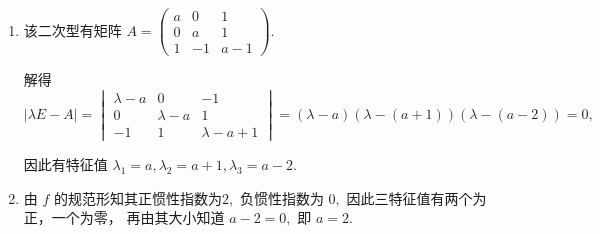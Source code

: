 \begin{answer}[2009T23]{}
    \begin{enumerate}[label=(\Roman*),topsep = 0pt]
        \item 该二次型有矩阵 $ A = \begin{pmatrix}
            a&0&1\\0&a&1\\ 1&-1&a-1
        \end{pmatrix}. $ 
        
        解得 $ |\lambda E-A| = \begin{vmatrix}
            \lambda-a&0&-1\\0&\lambda-a&1\\-1&1&\lambda-a+1
        \end{vmatrix} = (\lambda-a)(\lambda-(a+1))(\lambda - (a-2)) = 0, $ 
        
        因此有特征值 $ \lambda_1 = a,\lambda_2 = a+1,\lambda_3 = a-2. $ 
        \item 由 $ f $ 的规范形知其正惯性指数为$ 2, $ 
        负惯性指数为 $ 0, $ 因此三特征值有两个为正，一个为零，
        再由其大小知道 $ a - 2 = 0, $ 即 $ a = 2. $ 
    \end{enumerate}
\end{answer}
